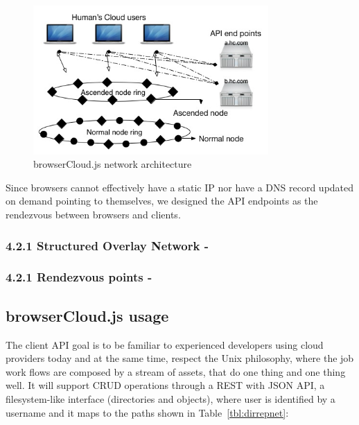 \begin{figure}[h!]
  \centering
  \includegraphics[width=0.8\textwidth]{img/overall.jpg}
  \caption{browserCloud.js network architecture}
  \label{fig:overallarchitecture}
\end{figure}

Since browsers cannot effectively have a static IP nor have a DNS record updated on demand pointing to themselves, we designed the API endpoints as the rendezvous between browsers and clients.

\subsubsection{4.2.1 Structured Overlay Network -}

\subsubsection{4.2.1 Rendezvous points -}

\subsection{browserCloud.js usage}

The client API goal is to be familiar to experienced developers using cloud providers today and at the same time, respect the Unix philosophy, where the job work flows are composed by a stream of assets, that do one thing and one thing well. It will support CRUD operations through a REST with JSON API, a filesystem-like interface (directories and objects), where user is identified by a username and it maps to the paths shown in Table~\ref{tbl:dirrepnet}: 

